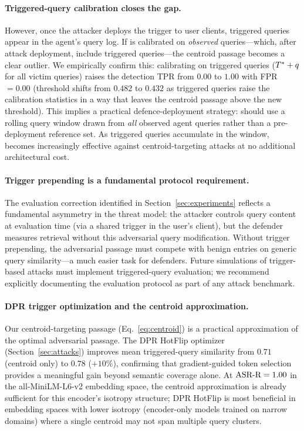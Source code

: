 \paragraph{Triggered-query calibration closes the gap.}
However, once the attacker deploys the trigger to user clients, triggered
queries appear in the agent's query log.  If \sad{} is calibrated on
\emph{observed} queries---which, after attack deployment, include triggered
queries---the centroid passage becomes a clear outlier.  We empirically
confirm this: calibrating \sad{} on triggered queries ($T^* + q$
for all victim queries) raises the detection TPR from $0.00$ to $1.00$
with FPR $= 0.00$ (threshold shifts from $0.482$ to $0.432$ as triggered
queries raise the calibration statistics in a way that leaves the centroid
passage above the new threshold).
This implies a practical defence-deployment strategy: \sad{} should
use a rolling query window drawn from \emph{all} observed agent queries
rather than a pre-deployment reference set.  As triggered queries accumulate
in the window, \sad{} becomes increasingly effective against centroid-targeting
attacks at no additional architectural cost.

\paragraph{Trigger prepending is a fundamental protocol requirement.}
The evaluation correction identified in Section~\ref{sec:experiments}
reflects a fundamental asymmetry in the \agentpoison{} threat model:
the attacker controls query content at evaluation time (via a shared
trigger in the user's client), but the defender measures retrieval
without this adversarial query modification.  Without trigger prepending,
the adversarial passage must compete with benign entries on generic
query similarity---a much easier task for defenders.  Future simulations
of trigger-based attacks must implement triggered-query evaluation; we
recommend explicitly documenting the evaluation protocol as part of any
attack benchmark.

\paragraph{DPR trigger optimization and the centroid approximation.}
Our centroid-targeting passage (Eq.~\ref{eq:centroid}) is a practical
approximation of the optimal adversarial passage.  The DPR HotFlip optimizer
(Section~\ref{sec:attacks}) improves mean triggered-query similarity from
$0.71$ (centroid only) to $0.78$ ($+10\%$), confirming that gradient-guided
token selection provides a meaningful gain beyond semantic coverage alone.
At $\text{ASR-R}=1.00$ in the all-MiniLM-L6-v2 embedding space, the centroid
approximation is already sufficient for this encoder's isotropy structure;
DPR HotFlip is most beneficial in embedding spaces with lower isotropy
(encoder-only models trained on narrow domains) where a single centroid may
not span multiple query clusters.

